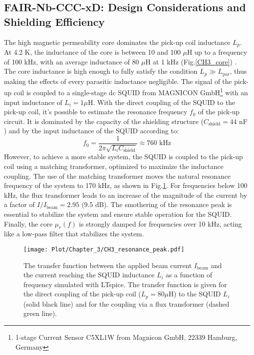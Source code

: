 \documentclass[12pt,a4paper]{report}
\begin{document}
       \subsection{FAIR-Nb-CCC-xD: Design Considerations and Shielding Efficiency}
       The high magnetic permeability core dominates the pick-up coil inductance \(L_p\). At 4.2 K, the inductance of the core is between 10 and 100 \(\mu\)H up to a frequency of 100 kHz, with an average inductance of 80 \(\mu\)H at 1 kHz (Fig.\ref{CH3_core}) \cite{Tympel:IBIC2016, Geithner_core}. The core inductance is high enough to fully satisfy the condition \(L_p \gg L_{\text{par}}\), thus making the effects of every parasitic inductance negligible. The signal of the pick-up coil is coupled to a single-stage dc SQUID from MAGNICON GmbH\footnote{1-stage Current Sensor C5XL1W from Magnicon GmbH, 22339 Hamburg, Germany} with an input inductance of \(L_i = 1 \mu\)H. With the direct coupling of the SQUID to the pick-up coil, it's possible to estimate the resonance frequency \(f_0\) of the pick-up circuit. It is dominated by the capacity of the shielding structure (\(C_{\text{shield}} = 44\) nF \cite{Tympel:IBIC2016}) and by the input inductance of the SQUID according to:
       \begin{equation}
       	f_0 = \frac{1}{2\pi\sqrt{L_i C_{\text{shield}}}} \approx 760 \text{ kHz}
       \end{equation}
       However, to achieve a more stable system, the SQUID is coupled to the pick-up coil using a matching transformer, optimized to maximize the inductance coupling. The use of the matching transformer moves the natural resonance frequency of the system to 170 kHz, as shown in Fig.\ref{CH3_resonance_peak}. For frequencies below 100 kHz, the flux transformer leads to an increase of the magnitude of the current by a factor of \(I/I_{\text{beam}} = 2.95\) (9.5 dB). The smothering of the resonance peak is essential to stabilize the system and ensure stable operation for the SQUID. Finally, the core \(\mu_r(f)\) is strongly damped for frequencies over 10 kHz, acting like a low-pass filter that stabilizes the system.
       
       \begin{figure}[H]
       	\centering
       	\texttt{[image: Plot/Chapter\_3/CH3\_resonance\_peak.pdf]}
       	\caption{\small{The transfer function between the applied beam current \(I_{\text{beam}}\) and the current reaching the SQUID inductance \(L_i\) as a function of frequency simulated with LTspice. The transfer function is given for the direct coupling of the pick-up coil (\(L_p = 80 \mu\)H) to the SQUID \(L_i\) (solid black line) and for the coupling via a flux transformer (dashed green line).}}
       	\label{CH3_resonance_peak}
       \end{figure}
       
\end{document}
